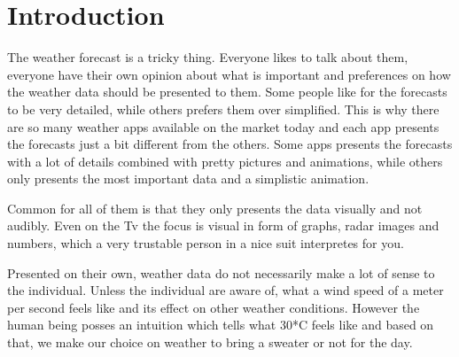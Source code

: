
\section{Introduction} %
\label{sec:introduction}

The weather forecast is a tricky thing. 
Everyone likes to talk about them, everyone have their own opinion about what is important and preferences on how the weather data should be presented to them. 
Some people like for the forecasts to be very detailed, while others prefers them over simplified. 
This is why there are so many weather apps available on the market today and each app presents the forecasts just a bit different from the others. 
Some apps presents the forecasts with a lot of details combined with pretty pictures and animations, while others only presents the most important data and a simplistic animation.

Common for all of them is that they only presents the data visually and not audibly. 
Even on the Tv the focus is visual in form of graphs, radar images and numbers, which a very trustable person in a nice suit interpretes for you.

Presented on their own, weather data do not necessarily make a lot of sense to the individual. 
Unless the individual are aware of, what a wind speed of a meter per second feels like and its effect on other weather conditions. 
However the human being posses an intuition which tells what 30*C feels like and based on that, we make our choice on weather to bring a sweater or not for the day.



